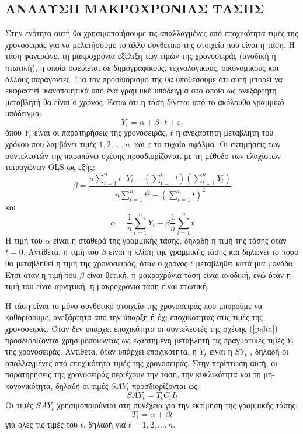 \subsection{ΑΝΑΛΥΣΗ ΜΑΚΡΟΧΡΟΝΙΑΣ ΤΑΣΗΣ}
Στην ενότητα αυτή θα χρησιμοποιήσουμε τις απαλλαγμένες από εποχικότητα
τιμές της χρονοσειράς για να μελετήσουμε το άλλο συνθετικό της στοιχείο που είναι
η τάση. Η τάση φανερώνει τη μακροχρόνια εξέλιξη των τιμών της χρονοσειράς
(ανοδική ή πτωτική), η οποία οφείλεται σε δημογραφικούς, τεχνολογικούς,
οικονομικούς και άλλους παράγοντες. Για τον προσδιορισμό της θα υποθέσουμε ότι
αυτή μπορεί να εκφραστεί ικανοποιητικά από ένα γραμμικό υπόδειγμα στο οποίο ως
ανεξάρτητη μεταβλητή θα είναι ο χρόνος. Έστω ότι η τάση δίνεται από το ακόλουθο
γραμμικό υπόδειγμα:\\
\begin{equation}
\label{palin}
Y_t=\alpha +\beta \cdot t + \varepsilon_t
\end{equation}
όπου $Y_t$ είναι οι παρατηρήσεις της χρονοσειράς, $t$ η ανεξάρτητη μεταβλητή του
χρόνου που λαμβάνει τιμές $1, 2,\ldots,n\:$ και $\varepsilon$ το τυχαίο σφάλμα. Οι εκτιμήσεις των
συντελεστών της παραπάνω σχέσης προσδιορίζονται με τη μέθοδο των ελαχίστων
τετραγώνων OLS ως εξής:\\
$$ \beta= \frac{n\sum_{t=1}^n t \cdot Y_t -\left(\sum_{t=1}^n t \right) \left( \sum_{t=1}^n Y_t \right)}{n \sum_{t=1}^n t^2 -\left( \sum_{t=1}^n t \right)^2} $$
και\\
$$ \alpha=\frac{1}{n} \sum_{t=1}^n Y_t -\beta \frac{1}{n} \sum_{t=1}^n t $$
Η τιμή του $\alpha $ είναι η σταθερά της γραμμικής τάσης, δηλαδή η τιμή της τάσης όταν
$t=0$. Αντίθετα, η τιμή του $\beta $ είναι η κλίση της γραμμικής τάσης και δηλώνει το πόσο
θα μεταβληθεί η τιμή της χρονοσειράς, όταν ο χρόνος $t$ μεταβληθεί κατά μια μονάδα.
Έτσι όταν η τιμή του $\beta $ είναι θετική, η μακροχρόνια τάση είναι ανοδική, ενώ όταν η
τιμή του είναι αρνητική, η μακροχρόνια τάση είναι πτωτική.

Η τάση είναι το μόνο συνθετικό στοιχείο της χρονοσειράς που μπορούμε να
καθορίσουμε, ανεξάρτητα από την ύπαρξη ή όχι εποχικότητας στις τιμές της
χρονοσειράς. Όταν δεν υπάρχει εποχικότητα οι συντελεστές της σχέσης $\left(\ref{palin}\right)$
προσδιορίζονται χρησιμοποιώντας ως εξαρτημένη μεταβλητή τις πραγματικές τιμές
$Y_t$ της χρονοσειράς. Αντίθετα, όταν υπάρχει εποχικότητα, η $Y_t$ είναι η $SY_t$ , δηλαδή
οι απαλλαγμένες από εποχικότητα τιμές της χρονοσειράς. Στην περίπτωση αυτή, οι
παρατηρήσεις της χρονοσειράς περιέχουν την τάση, την κυκλικότητα και τη μη-
κανονικότητα, δηλαδή οι τιμές $SAY_t$ προσδιορίζονται ως:\\
$$ SAY_t=T_tC_tI_t $$
Οι τιμές $SAY_t$ χρησιμοποιούνται στη συνέχεια για την εκτίμηση της γραμμικής
τάσης:\\
$$ T_t=\alpha + \beta t $$
για όλες τις τιμές του $t$, δηλαδή για $t = 1, 2,\ldots, n$.
